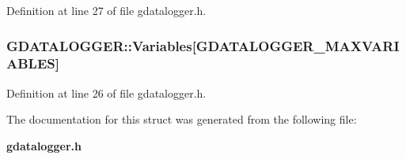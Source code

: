 Definition at line 27 of file gdatalogger.h.
\subsubsection[{Variables}]{ {\bf GDATALOGGER::Variables}[GDATALOGGER\_\-MAXVARIABLES]}\label{structGDATALOGGER_a6af9584d8665205b950cb2dcc5f90a94}


Definition at line 26 of file gdatalogger.h.

The documentation for this struct was generated from the following file:\begin{DoxyCompactItemize}
\item 
{\bf gdatalogger.h}\end{DoxyCompactItemize}
